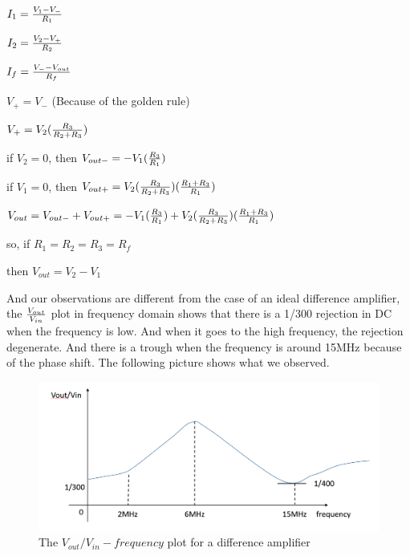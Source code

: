 \documentclass[11pt]{article}
\begin{document}
$I_{1}={V_{1}-V_{-}\over R_{1}}$

$I_{2}={V_{2}-V_{+}\over R_{2}}$

$I_{f}={V_{-}-V_{out}\over R_{f}}$

$V_{+}=V_{-}$ (Because of the golden rule)

$V_{+}=V_{2}({R_{3}\over R_{2}+R_{3}})$

if $V_{2}=0$, then $V_{out-}=-V_{1}({R_{3}\over R_{1}})$

if $V_{1}=0$, then $V_{out+}=V_{2}({R_{3}\over R_{2}+R_{3}})({R_{1}+R_{3}\over R_{1}})$

$V_{out}=V_{out-}+V_{out+}=-V_{1}({R_{3}\over R_{1}})+V_{2}({R_{3}\over R_{2}+R_{3}})({R_{1}+R_{3}\over R_{1}})$

so, if $R_{1}=R_{2}=R_{3}=R_{f}$

then $V_{out}=V_{2}-V_{1}$

And our observations are different from the case of an ideal difference amplifier, the $V_{out}\over V_{in}$ plot in frequency domain shows that there is a 1/300 rejection in DC when the frequency is low. And when it goes to the high frequency, the rejection degenerate. And there is a trough when the frequency is around 15MHz because of the phase shift. The following picture shows what we observed.

\begin{figure}[H]
 \begin{center}
  \includegraphics[width=\linewidth/2]{act4}
  \caption{The $V_{out}/V_{in} - frequency$ plot for a difference amplifier}
  \label{fig:act4}
 \end{center}
\end{figure}
\end{document}
